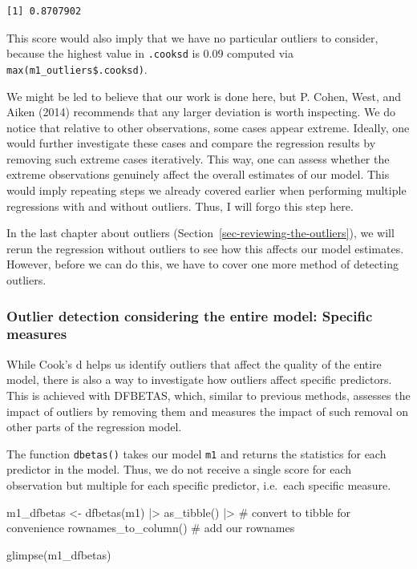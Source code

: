 \documentclass[
  letterpaper,
]{krantz}
\makeatletter
\newenvironment{Shaded}{\begin{snugshade}}{\end{snugshade}}
\newcommand{\CommentTok}[1]{\textcolor[rgb]{0.37,0.37,0.37}{#1}}
\newcommand{\FunctionTok}[1]{\textcolor[rgb]{0.28,0.35,0.67}{#1}}
\newcommand{\NormalTok}[1]{\textcolor[rgb]{0.00,0.23,0.31}{#1}}
\newcommand{\OtherTok}[1]{\textcolor[rgb]{0.00,0.23,0.31}{#1}}
\newcommand{\SpecialCharTok}[1]{\textcolor[rgb]{0.37,0.37,0.37}{#1}}
\newenvironment{kframe}{%
\medskip{}
\setlength{\fboxsep}{.8em}
 \def\at@end@of@kframe{}%
 \ifinner\ifhmode%
  \def\at@end@of@kframe{\end{minipage}}%
  \begin{minipage}{\columnwidth}%
 \fi\fi%
 \def\FrameCommand##1{\hskip\@totalleftmargin \hskip-\fboxsep
 \colorbox{shadecolor}{##1}\hskip-\fboxsep
     \hskip-\linewidth \hskip-\@totalleftmargin \hskip\columnwidth}%
 \MakeFramed {\advance\hsize-\width
   \@totalleftmargin\z@ \linewidth\hsize
   \@setminipage}}%
 {\par\unskip\endMakeFramed%
 \at@end@of@kframe}
\renewenvironment{Shaded}{\begin{kframe}}{\end{kframe}}
\makeatother
\begin{document}
\begin{verbatim}
[1] 0.8707902
\end{verbatim}

This score would also imply that we have no particular outliers to
consider, because the highest value in \texttt{.cooksd} is 0.09 computed
via \texttt{max(m1\_outliers\$.cooksd)}.

We might be led to believe that our work is done here, but P. Cohen,
West, and Aiken (2014) recommends that any larger deviation is worth
inspecting. We do notice that relative to other observations, some cases
appear extreme. Ideally, one would further investigate these cases and
compare the regression results by removing such extreme cases
iteratively. This way, one can assess whether the extreme observations
genuinely affect the overall estimates of our model. This would imply
repeating steps we already covered earlier when performing multiple
regressions with and without outliers. Thus, I will forgo this step
here.

In the last chapter about outliers
(Section~\ref{sec-reviewing-the-outliers}), we will rerun the regression
without outliers to see how this affects our model estimates. However,
before we can do this, we have to cover one more method of detecting
outliers.

\subsubsection{Outlier detection considering the entire model: Specific
measures}\label{sec-outlier-detection-specific-measures}

While Cook's d helps us identify outliers that affect the quality of the
entire model, there is also a way to investigate how outliers affect
specific predictors. This is achieved with DFBETAS, which, similar to
previous methods, assesses the impact of outliers by removing them and
measures the impact of such removal on other parts of the regression
model.

The function \texttt{dbetas()} takes our model \texttt{m1} and returns
the statistics for each predictor in the model. Thus, we do not receive
a single score for each observation but multiple for each specific
predictor, i.e.~each specific measure.

\begin{Shaded}
\begin{Highlighting}[]
\NormalTok{m1\_dfbetas }\OtherTok{\textless{}{-}}
  \FunctionTok{dfbetas}\NormalTok{(m1) }\SpecialCharTok{|\textgreater{}}
  \FunctionTok{as\_tibble}\NormalTok{() }\SpecialCharTok{|\textgreater{}}               \CommentTok{\# convert to tibble for convenience}
  \FunctionTok{rownames\_to\_column}\NormalTok{()          }\CommentTok{\# add our rownames}

\FunctionTok{glimpse}\NormalTok{(m1\_dfbetas)}
\end{Highlighting}
\end{Shaded}
\end{document}
